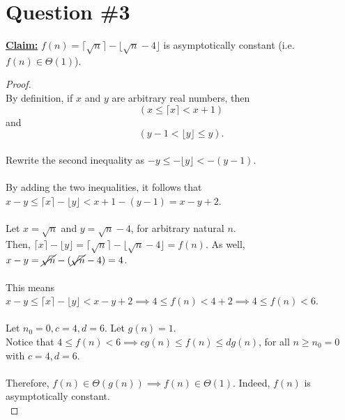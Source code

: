 \documentclass[12pt]{article}
\begin{document}
\section*{Question \#3}
\textbf{\underline{Claim:}} \( f(n) = \lceil \sqrt{n} \rceil - \lfloor \sqrt{n} - 4 \rfloor \) is asymptotically constant (i.e. \( f(n) \in \Theta(1) \)).
\begin{proof}
\leavevmode\\
    By definition, if \(x\) and \(y\) are arbitrary real numbers, then \[ (x \leq \lceil x \rceil < x + 1) \] and \[ (y - 1 < \lfloor y \rfloor \leq y) \text{.} \] \\
    Rewrite the second inequality as \( -y \leq - \lfloor y \rfloor < - (y - 1) \). \\
    \\
    By adding the two inequalities, it follows that \( x - y \leq \lceil x \rceil - \lfloor y \rfloor < x + 1 - (y - 1) = x - y + 2 \). \\
    \\
    Let \( x = \sqrt{n} \) and \( y = \sqrt{n} - 4 \), for arbitrary natural \( n \). \\
    Then, \( \lceil x \rceil - \lfloor y \rfloor = \lceil \sqrt{n} \rceil - \lfloor \sqrt{n} - 4 \rfloor = f(n) \). As well, \( x - y = \cancel{\sqrt{n}} - (\cancel{\sqrt{n}} - 4) = 4 \). \\
    \\
    This means \( x - y \leq \lceil x \rceil - \lfloor y \rfloor < x - y + 2 \implies 4 \leq f(n) < 4 + 2 \implies 4 \leq f(n) < 6 \). \\
    \\
    Let \( n_0 = 0, c = 4, d = 6 \). Let \( g(n) = 1 \). \\
    Notice that \( 4 \leq f(n) < 6 \implies cg(n) \leq f(n) \leq dg(n) \), for all \( n \geq n_0 = 0 \) with \( c = 4, d = 6 \). \\
    \\
    Therefore, \( f(n) \in \Theta(g(n)) \implies f(n) \in \Theta(1) \). Indeed, \( f(n) \) is asymptotically constant. \\
\end{proof}
\pagebreak
\end{document}
